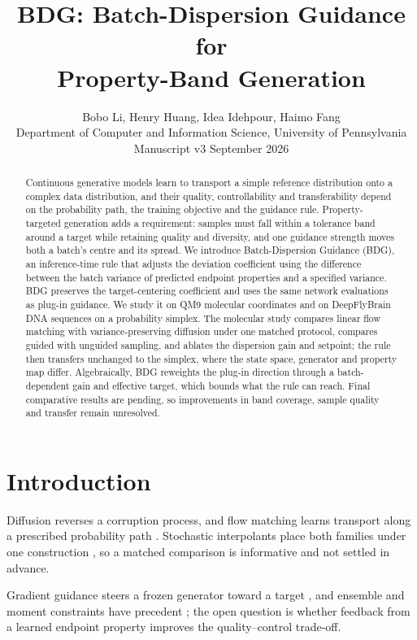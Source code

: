 \documentclass{article}
\title{BDG: Batch-Dispersion Guidance for\\Property-Band Generation}
\author{Bobo Li, Henry Huang, Idea Idehpour, Haimo Fang\\
Department of Computer and Information Science, University of Pennsylvania\\
\small Manuscript v3 \quad 27 September 2026}
\begin{document}
\maketitle
\begin{abstract}
Continuous generative models learn to transport a simple reference distribution onto a complex data distribution, and their quality, controllability and transferability depend on the probability path, the training objective and the guidance rule. Property-targeted generation adds a requirement: samples must fall within a tolerance band around a target while retaining quality and diversity, and one guidance strength moves both a batch's centre and its spread. We introduce Batch-Dispersion Guidance (BDG), an inference-time rule that adjusts the deviation coefficient using the difference between the batch variance of predicted endpoint properties and a specified variance. BDG preserves the target-centering coefficient and uses the same network evaluations as plug-in guidance. We study it on QM9 molecular coordinates and on DeepFlyBrain DNA sequences on a probability simplex. The molecular study compares linear flow matching with variance-preserving diffusion under one matched protocol, compares guided with unguided sampling, and ablates the dispersion gain and setpoint; the rule then transfers unchanged to the simplex, where the state space, generator and property map differ. Algebraically, BDG reweights the plug-in direction through a batch-dependent gain and effective target, which bounds what the rule can reach. Final comparative results are pending, so improvements in band coverage, sample quality and transfer remain unresolved.
\end{abstract}

\section{Introduction}
Diffusion reverses a corruption process, and flow matching learns transport along a prescribed probability path \citep{karras2022elucidating,lipman2022flow}. Stochastic interpolants place both families under one construction \citep{albergo2025stochastic}, so a matched comparison is informative and not settled in advance.

Gradient guidance steers a frozen generator toward a target \citep{chung2023dps,song2023lgd}, and ensemble and moment constraints have precedent \citep{corso2024particle,mgd2026moment}; the open question is whether feedback from a learned endpoint property improves the quality--control trade-off.
\end{document}
